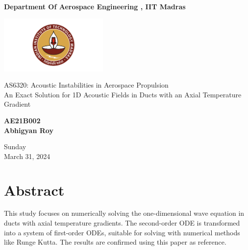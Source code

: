 \documentclass[8pt]{article} %
\begin{document}
\begin{titlepage}
    \begin{center}
        
        \vspace*{1cm}
            
        \Huge
        \textbf{Department Of Aerospace Engineering , IIT Madras}
	
        \vspace{0.5cm}

	\includegraphics[width=0.4\textwidth]{IITM_logo.png}

        \LARGE
        AS6320: Acoustic Instabilities in Aerospace Propulsion \\
	\vspace{2cm}
	An Exact Solution for 1D Acoustic Fields in Ducts with an Axial Temperature Gradient
            
        \vspace{1.5cm}
            
        \textbf{AE21B002\\Abhigyan Roy\\}
            
        \vfill
           
        \vspace{0.8cm}
            
        \Large
        Sunday\\
        March 31, 2024\\
            
    \end{center}
\end{titlepage}

\newpage
\tableofcontents
\vspace{2cm}
\listoffigures


\newpage

\section{Abstract}
This study focuses on numerically solving the one-dimensional wave equation in ducts with axial temperature gradients. The second-order ODE is transformed into a system of first-order ODEs, suitable for solving with numerical methods like Runge Kutta. The results are confirmed using this paper as reference.\cite{refpaper}%
\end{document}
